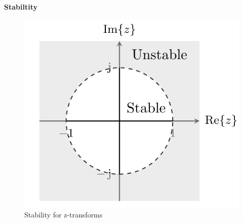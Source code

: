 \documentclass{article}
\begin{document}
\textbf{Stabiltity}
\begin{figure}[!h]
   \centering
   \includegraphics[width=12cm]{image/stability_z-transform.png} 
   \caption{Stability for z-transforms}
   \label{fig:stability_z-transform}
\end{figure}
\end{document}
